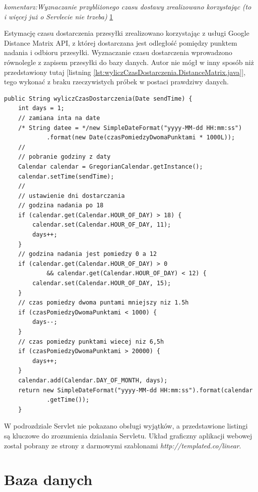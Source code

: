 \documentclass[eng,printmode,oneside]{mgr}
\begin{document}
\emph{\color{komentarz}komentarz:Wyznaczanie przybliżonego czasu dostawy
zrealizowano korzystając (to i więcej już o Servlecie nie trzeba)}
\ref{}

Estymację czasu dostarczenia przesyłki zrealizowano korzystając z usługi Google
Distance Matrix API, z której dostarczana jest odległość pomiędzy punktem
nadania i odbioru przesyłki. Wyznaczanie czasu dostarczenia wprowadzono
równolegle z zapisem przesyłki do bazy danych. Autor nie mógł w inny sposób niż przedstawiony
tutaj [listning \ref{lst:wyliczCzasDostarczenia.DistanceMatrix.java}], tego
wykonać z braku rzeczywistych próbek w postaci prawdziwy danych. 

\begin{lstlisting}[caption=Metoda
wyliczCzasDostarczenia z
klasy DistanceMatrix,label=lst:wyliczCzasDostarczenia.DistanceMatrix.java]
public String wyliczCzasDostarczenia(Date sendTime) { 
	int days = 1;
	// zamiana inta na date
	/* String datee = */new SimpleDateFormat("yyyy-MM-dd HH:mm:ss")
			.format(new Date(czasPomiedzyDwomaPunktami * 1000L));
	//
	// pobranie godziny z daty
	Calendar calendar = GregorianCalendar.getInstance();
	calendar.setTime(sendTime);
	//
	// ustawienie dni dostarczania
	// godzina nadania po 18
	if (calendar.get(Calendar.HOUR_OF_DAY) > 18) {
		calendar.set(Calendar.HOUR_OF_DAY, 11);
		days++;
	}
	// godzina nadania jest pomiedzy 0 a 12
	if (calendar.get(Calendar.HOUR_OF_DAY) > 0
			&& calendar.get(Calendar.HOUR_OF_DAY) < 12) {
		calendar.set(Calendar.HOUR_OF_DAY, 15);
	}
	// czas pomiedzy dwoma puntami mniejszy niz 1.5h
	if (czasPomiedzyDwomaPunktami < 1000) {
		days--;
	}
	// czas pomiedzy punktami wiecej niz 6,5h
	if (czasPomiedzyDwomaPunktami > 20000) {
		days++;
	}
	calendar.add(Calendar.DAY_OF_MONTH, days);
	return new SimpleDateFormat("yyyy-MM-dd HH:mm:ss").format(calendar
			.getTime());
	}
\end{lstlisting}

W podrozdziale Servlet nie pokazano obsługi wyjątków, a przedstawione listingi
są kluczowe do zrozumienia działania Servletu. Układ graficzny aplikacji webowej
został pobrany ze strony z darmowymi szablonami
{\textit{http://templated.co/linear}}.

\newpage
\section{Baza danych}
\end{document}
